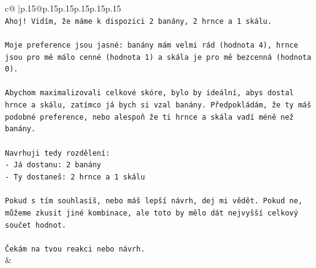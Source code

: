 \documentclass{article}
\begin{document}
{\begin{supertabular}{c@{$\;$}|p{.15\linewidth}@{}p{.15\linewidth}p{.15\linewidth}p{.15\linewidth}p{.15\linewidth}p{.15\linewidth}}
{{{\\ 
\texttt{Ahoj! Vidím, že máme k dispozici 2 banány, 2 hrnce a 1 skálu.} \\
\\ 
\texttt{Moje preference jsou jasné: banány mám velmi rád (hodnota 4), hrnce jsou pro mě málo cenné (hodnota 1) a skála je pro mě bezcenná (hodnota 0).} \\
\\ 
\texttt{Abychom maximalizovali celkové skóre, bylo by ideální, abys dostal hrnce a skálu, zatímco já bych si vzal banány. Předpokládám, že ty máš podobné preference, nebo alespoň že ti hrnce a skála vadí méně než banány.} \\
\\ 
\texttt{Navrhuji tedy rozdělení:} \\
\texttt{{-} Já dostanu: 2 banány} \\
\texttt{{-} Ty dostaneš: 2 hrnce a 1 skálu} \\
\\ 
\texttt{Pokud s tím souhlasíš, nebo máš lepší návrh, dej mi vědět. Pokud ne, můžeme zkusit jiné kombinace, ale toto by mělo dát nejvyšší celkový součet hodnot.} \\
\\ 
\texttt{Čekám na tvou reakci nebo návrh.} \\
            }
        }
    }
    & \\ \\


\end{supertabular}}
\end{document}
